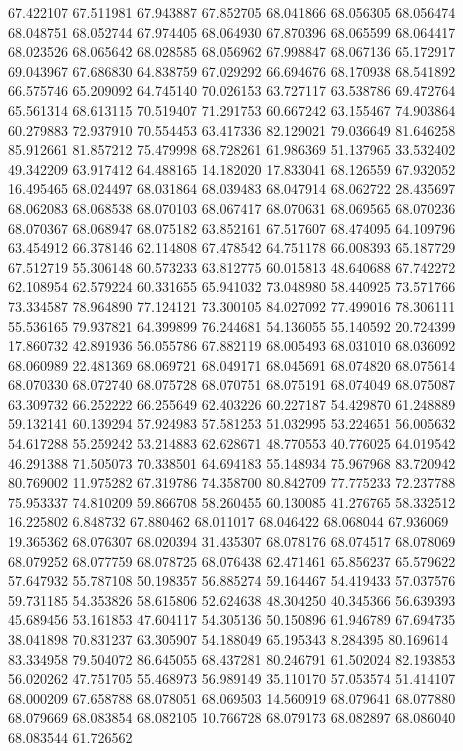 67.422107
67.511981
67.943887
67.852705
68.041866
68.056305
68.056474
68.048751
68.052744
67.974405
68.064930
67.870396
68.065599
68.064417
68.023526
68.065642
68.028585
68.056962
67.998847
68.067136
65.172917
69.043967
67.686830
64.838759
67.029292
66.694676
68.170938
68.541892
66.575746
65.209092
64.745140
70.026153
63.727117
63.538786
69.472764
65.561314
68.613115
70.519407
71.291753
60.667242
63.155467
74.903864
60.279883
72.937910
70.554453
63.417336
82.129021
79.036649
81.646258
85.912661
81.857212
75.479998
68.728261
61.986369
51.137965
33.532402
49.342209
63.917412
64.488165
14.182020
17.833041
68.126559
67.932052
16.495465
68.024497
68.031864
68.039483
68.047914
68.062722
28.435697
68.062083
68.068538
68.070103
68.067417
68.070631
68.069565
68.070236
68.070367
68.068947
68.075182
63.852161
67.517607
68.474095
64.109796
63.454912
66.378146
62.114808
67.478542
64.751178
66.008393
65.187729
67.512719
55.306148
60.573233
63.812775
60.015813
48.640688
67.742272
62.108954
62.579224
60.331655
65.941032
73.048980
58.440925
73.571766
73.334587
78.964890
77.124121
73.300105
84.027092
77.499016
78.306111
55.536165
79.937821
64.399899
76.244681
54.136055
55.140592
20.724399
17.860732
42.891936
56.055786
67.882119
68.005493
68.031010
68.036092
68.060989
22.481369
68.069721
68.049171
68.045691
68.074820
68.075614
68.070330
68.072740
68.075728
68.070751
68.075191
68.074049
68.075087
63.309732
66.252222
66.255649
62.403226
60.227187
54.429870
61.248889
59.132141
60.139294
57.924983
57.581253
51.032995
53.224651
56.005632
54.617288
55.259242
53.214883
62.628671
48.770553
40.776025
64.019542
46.291388
71.505073
70.338501
64.694183
55.148934
75.967968
83.720942
80.769002
11.975282
67.319786
74.358700
80.842709
77.775233
72.237788
75.953337
74.810209
59.866708
58.260455
60.130085
41.276765
58.332512
16.225802
6.848732
67.880462
68.011017
68.046422
68.068044
67.936069
19.365362
68.076307
68.020394
31.435307
68.078176
68.074517
68.078069
68.079252
68.077759
68.078725
68.076438
62.471461
65.856237
65.579622
57.647932
55.787108
50.198357
56.885274
59.164467
54.419433
57.037576
59.731185
54.353826
58.615806
52.624638
48.304250
40.345366
56.639393
45.689456
53.161853
47.604117
54.305136
50.150896
61.946789
67.694735
38.041898
70.831237
63.305907
54.188049
65.195343
8.284395
80.169614
83.334958
79.504072
86.645055
68.437281
80.246791
61.502024
82.193853
56.020262
47.751705
55.468973
56.989149
35.110170
57.053574
51.414107
68.000209
67.658788
68.078051
68.069503
14.560919
68.079641
68.077880
68.079669
68.083854
68.082105
10.766728
68.079173
68.082897
68.086040
68.083544
61.726562
